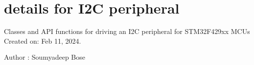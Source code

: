 \chapter{details for I2C peripheral}
\hypertarget{_driver}{}\label{_driver}
Classes and API functions for driving an I2C peripheral for STM32\+F429xx MCUs Created on\+: Feb 11, 2024.

\begin{DoxyAuthor}{Author}
\+: Soumyadeep Bose 
\end{DoxyAuthor}
